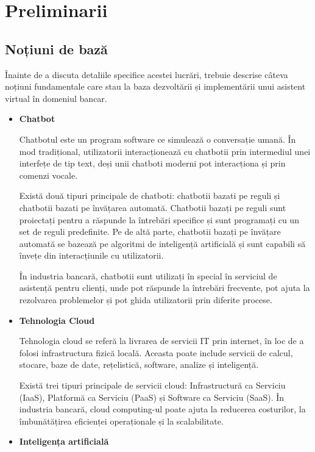 \chapter{Preliminarii}

\section{Noțiuni de bază}

Înainte de a discuta detaliile specifice acestei lucrări, trebuie descrise câteva noțiuni fundamentale care stau la baza dezvoltării și implementării unui asistent virtual în domeniul bancar.

\begin{itemize}
    \item \textbf{Chatbot} 

Chatbotul este un program software ce simulează o conversație umană. În mod tradițional, utilizatorii interacționează cu chatbotii prin intermediul unei interfețe de tip text, deși unii chatboti moderni pot interacționa și prin comenzi vocale.

Există două tipuri principale de chatboti: chatbotii bazati pe reguli și chatbotii bazati pe învățarea automată. Chatbotii bazați pe reguli sunt proiectați pentru a răspunde la întrebări specifice și sunt programați cu un set de reguli predefinite. Pe de altă parte, chatbotii bazați pe învățare automată se bazează pe algoritmi de inteligență artificială și sunt capabili să învețe din interacțiunile cu utilizatorii.

În industria bancară, chatbotii sunt utilizați în special în serviciul de asistență pentru clienți, unde pot răspunde la întrebări frecvente, pot ajuta la rezolvarea problemelor și pot ghida utilizatorii prin diferite procese.

    \item \textbf{Tehnologia Cloud}

Tehnologia cloud se referă la livrarea de servicii IT prin internet, în loc de a folosi infrastructura fizică locală. Aceasta poate include servicii de calcul, stocare, baze de date, rețelistică, software, analize și inteligență.

Există trei tipuri principale de servicii cloud: Infrastructură ca Serviciu (IaaS), Platformă ca Serviciu (PaaS) și Software ca Serviciu (SaaS). În industria bancară, cloud computing-ul poate ajuta la reducerea costurilor, la îmbunătățirea eficienței operaționale și la scalabilitate.

    \item \textbf{Inteligența artificială} 


\end{itemize}
